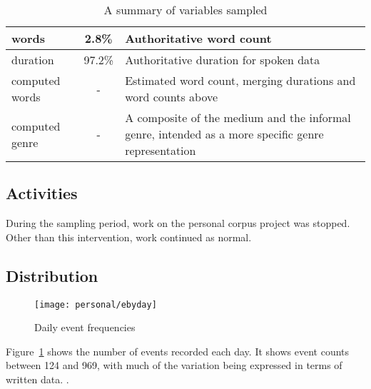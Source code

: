 \begin{table}[hp]
\begin{tabular}{ | l | c | p{7cm} |}
    words               & 2.8\% & Authoritative word count\\ \hline
    duration            & 97.2\% & Authoritative duration for spoken data\\ \hline
    computed words      & - & Estimated word count, merging durations and word counts above\\ \hline
    computed genre      & - & A composite of the medium and the informal genre, intended as a more specific genre representation \\
    \hline
    \end{tabular}
\caption{A summary of variables sampled}
\label{table:personal:variables}
\end{table}





\subsection{Activities}
During the sampling period, work on the personal corpus project was stopped.  Other than this intervention, work continued as normal.








\subsection{Distribution}

\begin{figure}[hp]
    \centering
    \texttt{[image: personal/ebyday]}
    \caption{Daily event frequencies}
    \label{fig:personal:eventcountbyday}
\end{figure}


Figure~\ref{fig:personal:eventcountbyday} shows the number of events recorded each day.  It shows event counts between 124 and 969, with much of the variation being expressed in terms of written data.  .

